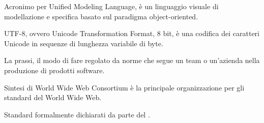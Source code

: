 Acronimo per Unified Modeling Language, è un linguaggio visuale di modellazione e specifica basato sul paradigma object-oriented.

UTF-8, ovvero Unicode Transformation Format, 8 bit, è una codifica dei caratteri Unicode in sequenze di lunghezza variabile di byte.
\clearpage

La prassi, il modo di fare regolato da norme che segue un team o un'azienda nella produzione di prodotti software.

Sintesi di World Wide Web Consortium \`e la principale organizzazione per gli standard del World Wide Web.

Standard formalmente dichiarati da parte del .
\clearpage


